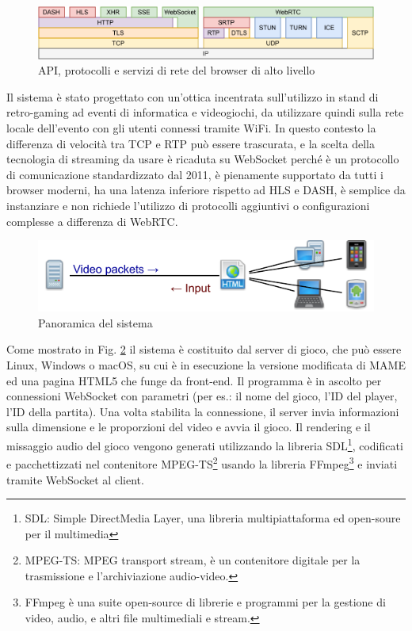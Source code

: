 \begin{figure}[H]
	\includegraphics[width=\linewidth]{immagini/webprotocols}
	\caption{API, protocolli e servizi di rete del browser di alto livello}
	\label{fig:webprotocols}
\end{figure}

Il sistema è stato progettato con un'ottica incentrata sull'utilizzo in stand di retro-gaming ad eventi di informatica e videogiochi, da utilizzare quindi sulla rete locale dell'evento con gli utenti connessi tramite WiFi. In questo contesto la differenza di velocità tra TCP e RTP può essere trascurata, e la scelta della tecnologia di streaming da usare è ricaduta su WebSocket perché è un protocollo di comunicazione standardizzato dal 2011, è pienamente supportato da tutti i browser moderni, ha una latenza inferiore rispetto ad HLS e DASH, è semplice da instanziare e non richiede l'utilizzo di protocolli aggiuntivi o configurazioni complesse a differenza di WebRTC.

\begin{figure}[H]
	\includegraphics[width=\linewidth]{immagini/proposed_system}
	\caption{Panoramica del sistema}
	\label{fig:proposed_system}
\end{figure}

Come mostrato in Fig. \ref{fig:proposed_system} il sistema è costituito dal server di gioco, che può essere Linux, Windows o macOS, su cui è in esecuzione la versione modificata di MAME ed una pagina HTML5 che funge da front-end. Il programma è in ascolto per connessioni WebSocket con parametri (per es.: il nome del gioco, l'ID del player, l'ID della partita). Una volta stabilita la connessione, il server invia informazioni sulla dimensione e le proporzioni del video e avvia il gioco. Il rendering e il missaggio audio del gioco vengono generati utilizzando la libreria SDL\footnote{SDL: Simple DirectMedia Layer, una libreria multipiattaforma ed open-soure per il multimedia}, codificati e pacchettizzati nel contenitore MPEG-TS\footnote{MPEG-TS: MPEG transport stream, è un contenitore digitale per la trasmissione e l'archiviazione audio-video.} usando la libreria FFmpeg\footnote{FFmpeg è una suite open-source di librerie e programmi per la gestione di video, audio, e altri file multimediali e stream.} e inviati tramite WebSocket al client.


